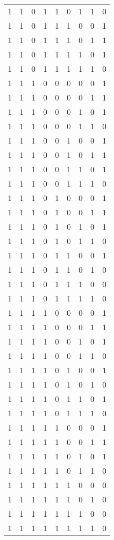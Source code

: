 \begin{longtable}[c]{rrrrrrrrr}
        1 & 1 & 0 & 1 & 1 & 0 & 1 & 1 & 0 \\
        1 & 1 & 0 & 1 & 1 & 1 & 0 & 0 & 1 \\
        1 & 1 & 0 & 1 & 1 & 1 & 0 & 1 & 1 \\
        1 & 1 & 0 & 1 & 1 & 1 & 1 & 0 & 1 \\
        1 & 1 & 0 & 1 & 1 & 1 & 1 & 1 & 0 \\
        1 & 1 & 1 & 0 & 0 & 0 & 0 & 0 & 1 \\
        1 & 1 & 1 & 0 & 0 & 0 & 0 & 1 & 1 \\
        1 & 1 & 1 & 0 & 0 & 0 & 1 & 0 & 1 \\
        1 & 1 & 1 & 0 & 0 & 0 & 1 & 1 & 0 \\
        1 & 1 & 1 & 0 & 0 & 1 & 0 & 0 & 1 \\
        1 & 1 & 1 & 0 & 0 & 1 & 0 & 1 & 1 \\
        1 & 1 & 1 & 0 & 0 & 1 & 1 & 0 & 1 \\
        1 & 1 & 1 & 0 & 0 & 1 & 1 & 1 & 0 \\
        1 & 1 & 1 & 0 & 1 & 0 & 0 & 0 & 1 \\
        1 & 1 & 1 & 0 & 1 & 0 & 0 & 1 & 1 \\
        1 & 1 & 1 & 0 & 1 & 0 & 1 & 0 & 1 \\
        1 & 1 & 1 & 0 & 1 & 0 & 1 & 1 & 0 \\
        1 & 1 & 1 & 0 & 1 & 1 & 0 & 0 & 1 \\
        1 & 1 & 1 & 0 & 1 & 1 & 0 & 1 & 0 \\
        1 & 1 & 1 & 0 & 1 & 1 & 1 & 0 & 0 \\
        1 & 1 & 1 & 0 & 1 & 1 & 1 & 1 & 0 \\
        1 & 1 & 1 & 1 & 0 & 0 & 0 & 0 & 1 \\
        1 & 1 & 1 & 1 & 0 & 0 & 0 & 1 & 1 \\
        1 & 1 & 1 & 1 & 0 & 0 & 1 & 0 & 1 \\
        1 & 1 & 1 & 1 & 0 & 0 & 1 & 1 & 0 \\
        1 & 1 & 1 & 1 & 0 & 1 & 0 & 0 & 1 \\
        1 & 1 & 1 & 1 & 0 & 1 & 0 & 1 & 0 \\
        1 & 1 & 1 & 1 & 0 & 1 & 1 & 0 & 1 \\
        1 & 1 & 1 & 1 & 0 & 1 & 1 & 1 & 0 \\
        1 & 1 & 1 & 1 & 1 & 0 & 0 & 0 & 1 \\
        1 & 1 & 1 & 1 & 1 & 0 & 0 & 1 & 1 \\
        1 & 1 & 1 & 1 & 1 & 0 & 1 & 0 & 1 \\
        1 & 1 & 1 & 1 & 1 & 0 & 1 & 1 & 0 \\
        1 & 1 & 1 & 1 & 1 & 1 & 0 & 0 & 0 \\
        1 & 1 & 1 & 1 & 1 & 1 & 0 & 1 & 0 \\
        1 & 1 & 1 & 1 & 1 & 1 & 1 & 0 & 0 \\
        1 & 1 & 1 & 1 & 1 & 1 & 1 & 1 & 0 \\

\end{longtable}

